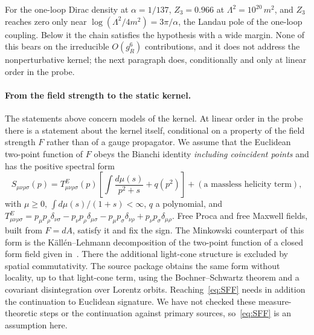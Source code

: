 For the one-loop Dirac density at $\alpha=1/137$, $Z_3=0.966$ at
$\Lambda^2=10^{20}\,m^2$, and $Z_3$ reaches zero only near
$\log(\Lambda^2/4m^2)=3\pi/\alpha$, the Landau pole of the one-loop coupling.
Below it the chain satisfies the hypothesis with a wide margin. None of this
bears on the irreducible $O(g_R^6)$ contributions, and it does not address the
nonperturbative kernel; the next paragraph does, conditionally and only at
linear order in the probe.

\paragraph{From the field strength to the static kernel.}
The statements above concern models of the kernel. At linear order in the
probe there is a statement about the kernel itself, conditional on a property
of the field strength $F$ rather than of a gauge propagator. We assume that
the Euclidean two-point function of $F$ obeys the Bianchi identity
\emph{including coincident points} and has the positive spectral form
\begin{equation}
S_{\mu\nu\rho\sigma}(p)=T^{E}_{\mu\nu\rho\sigma}(p)
\left[\int\frac{d\mu(s)}{p^{2}+s}+q(p^{2})\right]
+(\text{a massless helicity term}),
\label{eq:SFF}
\end{equation}
with $\mu\ge0$, $\int d\mu(s)/(1+s)<\infty$, $q$ a polynomial, and
$T^{E}_{\mu\nu\rho\sigma}=p_\mu p_\rho\delta_{\nu\sigma}-p_\nu p_\rho\delta_{\mu\sigma}
-p_\mu p_\sigma\delta_{\nu\rho}+p_\nu p_\sigma\delta_{\mu\rho}$. Free Proca and
free Maxwell fields, built from $F=dA$, satisfy it and fix the sign. The
Minkowski counterpart of this form is the K\"all\'en--Lehmann decomposition of
the two-point function of a closed form field given
in~\cite[Sect.~3]{benedetti_casini_magan_2023}. There the additional
light-cone structure is excluded by spatial commutativity. The source package
obtains the same form without locality, up to that light-cone term, using
the Bochner--Schwartz theorem and a covariant disintegration over Lorentz
orbits. Reaching~\eqref{eq:SFF} needs in addition the continuation to
Euclidean signature. We have not checked these measure-theoretic steps or
the continuation against primary sources, so~\eqref{eq:SFF} is an assumption
here.

